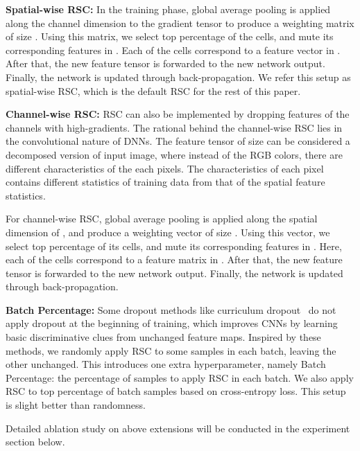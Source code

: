 \documentclass[runningheads]{llncs}
\begin{document}
\textbf{Spatial-wise RSC:}
In the training phase, global average pooling is applied along the channel dimension to the gradient tensor  to produce a weighting matrix   of size . Using this matrix, we select top  percentage of the  cells, and mute its corresponding features in . 
Each of the  cells correspond to a  feature vector in . 
After that, the new feature tensor  is forwarded to the new network output. Finally, the network is updated through back-propagation. 
We refer this setup as spatial-wise RSC, which is the default RSC for the rest of this paper. 











\textbf{Channel-wise RSC:}  RSC can also be implemented by dropping features of the channels with high-gradients. The rational behind the channel-wise RSC lies in the convolutional nature of DNNs. The feature tensor of size  can be considered a decomposed version of input image, where instead of the RGB colors, there are  different characteristics of the each pixels. The  characteristics of each pixel contains different statistics of training data from that of the spatial feature statistics. 


For channel-wise RSC, global average pooling is applied along the spatial dimension of , and produce a weighting vector of size .  Using this vector, we select top  percentage of its  cells, and mute its corresponding features in . Here, each of the  cells correspond to a  feature matrix in . After that, the new feature tensor  is forwarded to the new network output. Finally, the network is updated through back-propagation. 

\textbf{Batch Percentage:} 
Some dropout methods like curriculum dropout~\cite{morerio2017curriculum} do not apply dropout at the beginning of training, which improves CNNs by learning basic discriminative clues from unchanged feature maps. Inspired by these methods, we randomly apply RSC to some samples in each batch, leaving the other unchanged. This introduces one extra hyperparameter, namely Batch Percentage: the percentage of samples to apply RSC in each batch. We also apply RSC to top percentage of batch samples based on cross-entropy loss. This setup is slight better than randomness.



Detailed ablation study on above extensions will be conducted in the experiment section below. 
\end{document}
